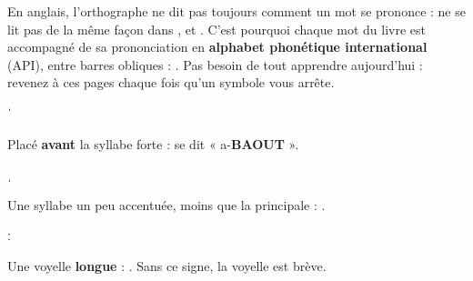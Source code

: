 
En anglais, l'orthographe ne dit pas toujours comment un mot se prononce : 
ne se lit pas de la même façon dans ,  et . C'est pourquoi chaque
mot du livre est accompagné de sa prononciation en \textbf{alphabet phonétique international}
(API), entre barres obliques :  . Pas besoin de tout apprendre
aujourd'hui : revenez à ces pages chaque fois qu'un symbole vous arrête.

\begin{paire}[3]
\begin{tcolorbox}[otBase,colback=otNavyTint,colframe=otNavyTint,halign=center]
{\otIPAfont\fontsize{22}{24}\selectfont\color{otNavy}ˈ}\par\vspace{1mm}
{\fontsize{9.6}{12}\selectfont Placé \textbf{avant} la syllabe forte :   se dit
« a-\textbf{BAOUT} ».\par}
\end{tcolorbox}
\begin{tcolorbox}[otBase,colback=otNavyTint,colframe=otNavyTint,halign=center]
{\otIPAfont\fontsize{22}{24}\selectfont\color{otNavy}ˌ}\par\vspace{1mm}
{\fontsize{9.6}{12}\selectfont Une syllabe un peu accentuée, moins que la principale :  .\par}
\end{tcolorbox}
\begin{tcolorbox}[otBase,colback=otNavyTint,colframe=otNavyTint,halign=center]
{\otIPAfont\fontsize{22}{24}\selectfont\color{otNavy}ː}\par\vspace{1mm}
{\fontsize{9.6}{12}\selectfont Une voyelle \textbf{longue} :  . Sans ce signe, la voyelle est brève.\par}
\end{tcolorbox}
\end{paire}

